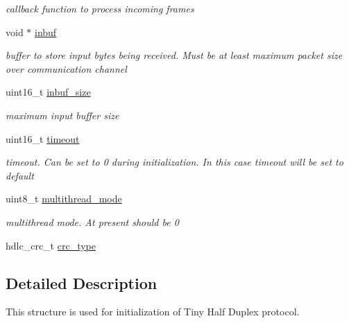 \begin{DoxyCompactItemize}
\begin{DoxyCompactList}\small\item\em callback function to process incoming frames \end{DoxyCompactList}\item 
\mbox{\label{structSTinyHdInit___a5996a48606a90ff9938e4037612cf97d}} 
void $\ast$ \hyperlink{structSTinyHdInit___a5996a48606a90ff9938e4037612cf97d}{inbuf}
\begin{DoxyCompactList}\small\item\em buffer to store input bytes being received. Must be at least maximum packet size over communication channel \end{DoxyCompactList}\item 
\mbox{\label{structSTinyHdInit___a0eed47c62a16fa29435d480541989cf6}} 
uint16\+\_\+t \hyperlink{structSTinyHdInit___a0eed47c62a16fa29435d480541989cf6}{inbuf\+\_\+size}
\begin{DoxyCompactList}\small\item\em maximum input buffer size \end{DoxyCompactList}\item 
\mbox{\label{structSTinyHdInit___ac7a1ae9314efc1296d78927198f07ac8}} 
uint16\+\_\+t \hyperlink{structSTinyHdInit___ac7a1ae9314efc1296d78927198f07ac8}{timeout}
\begin{DoxyCompactList}\small\item\em timeout. Can be set to 0 during initialization. In this case timeout will be set to default \end{DoxyCompactList}\item 
\mbox{\label{structSTinyHdInit___a404947e25922fa8400daa924a032897e}} 
uint8\+\_\+t \hyperlink{structSTinyHdInit___a404947e25922fa8400daa924a032897e}{multithread\+\_\+mode}
\begin{DoxyCompactList}\small\item\em multithread mode. At present should be 0 \end{DoxyCompactList}\item 
hdlc\+\_\+crc\+\_\+t \hyperlink{structSTinyHdInit___a520f9fbb19f5ec84f3f86a10d819faf4}{crc\+\_\+type}
\end{DoxyCompactItemize}


\subsection{Detailed Description}
This structure is used for initialization of Tiny Half Duplex protocol. 

